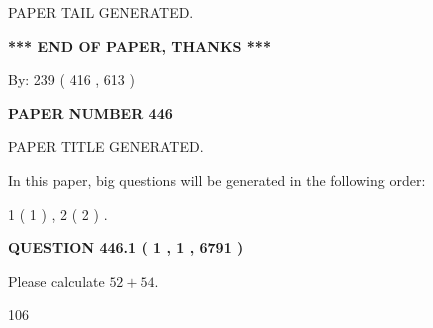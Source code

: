 \documentclass[12pt]{article}
\begin{document}
   
   
   
   
   
 \vspace{0.2in}
 
   
   
\vspace{2.0in} PAPER TAIL GENERATED.
   
   
   
   
\vspace{1.0in} 
{\textbf{\large{ *** END OF PAPER, THANKS *** }}} 
   
   
\hspace{1.0in} By: 
 239 ( 416 ,  613 )
   
   
   
   
\newpage 
\setcounter{page}{ 
   446001 } 
   
   
   
   
 {\textbf{ \Large{ PAPER NUMBER  446  }}}
   
   
\vspace{0.2in}
   
   
   
   
   
   
   
   
 \vspace{0.2in}
 
 
 
 
   
   
 PAPER TITLE GENERATED.
   
   
   
\vspace{0.2in}
   
In this paper, big questions will be generated in the following order: 
   
   
   1 ( 1 )
 ,
   2 ( 2 )
 .
  
\vspace{0.2in}
  
{\textbf{\Large{QUESTION
446.1 
 ( 1 , 1 , 6791 )
}}}
  
  
 
Please calculate $ %
52 +  %
54 $.
 
 
 
\noindent{}
 
 

106
 
 
\noindent{}
 
\end{document}
